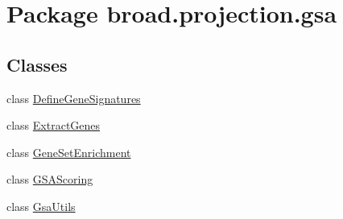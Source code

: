 \hypertarget{namespacebroad_1_1projection_1_1gsa}{\section{Package broad.\+projection.\+gsa}
\label{namespacebroad_1_1projection_1_1gsa}
}
\subsection*{Classes}
\begin{DoxyCompactItemize}
\item 
class \hyperlink{classbroad_1_1projection_1_1gsa_1_1_define_gene_signatures}{Define\+Gene\+Signatures}
\item 
class \hyperlink{classbroad_1_1projection_1_1gsa_1_1_extract_genes}{Extract\+Genes}
\item 
class \hyperlink{classbroad_1_1projection_1_1gsa_1_1_gene_set_enrichment}{Gene\+Set\+Enrichment}
\item 
class \hyperlink{classbroad_1_1projection_1_1gsa_1_1_g_s_a_scoring}{G\+S\+A\+Scoring}
\item 
class \hyperlink{classbroad_1_1projection_1_1gsa_1_1_gsa_utils}{Gsa\+Utils}
\end{DoxyCompactItemize}
